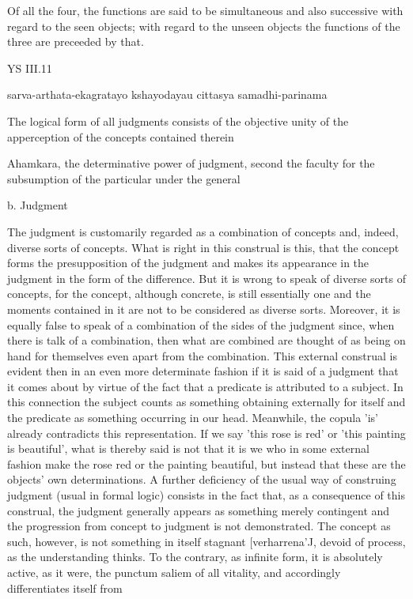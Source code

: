 Of all the four, the functions are said to be simultaneous and also successive
with regard to the seen objects;
with regard to the unseen objects
the functions of the three are preceeded by that.

YS III.11

sarva-arthata-ekagratayo kshayodayau cittasya samadhi-parinama

The logical form of all judgments consists of the objective unity of the
apperception of the concepts contained therein

Ahamkara, the determinative power of judgment,
second the faculty for the subsumption of the particular under the general

b. Judgment

The judgment is customarily regarded as
a combination of concepts and, indeed, diverse sorts of concepts.
What is right in this construal is this,
that the concept forms the presupposition of the judgment and
makes its appearance in the judgment in the form of the difference.
But it is wrong to speak of diverse sorts of concepts,
for the concept, although concrete, is still essentially one and
the moments contained in it are not to be considered as diverse sorts.
Moreover, it is equally false to speak of a combination of
the sides of the judgment since, when there is talk of a combination,
then what are combined are thought of as being on hand for themselves
even apart from the combination.
This external construal is evident then in an even more determinate fashion if it is said of a
judgment that it comes about by virtue of the fact that a predicate is attributed to
a subject.
In this connection the subject counts as something obtaining externally
for itself and the predicate as something occurring in our head.
Meanwhile, the copula 'is' already contradicts this representation.
If we say 'this rose is red' or 'this painting is beautiful',
what is thereby said is not that it is we who in some external
fashion make the rose red or the painting beautiful,
but instead that these are the objects' own determinations.
A further deficiency of the usual way of construing
judgment (usual in formal logic) consists in the fact that, as a consequence of this
construal, the judgment generally appears as something merely contingent and the
progression from concept to judgment is not demonstrated. The concept as such,
however, is not something in itself stagnant [verharrena'J, devoid of process, as the
understanding thinks. To the contrary, as infinite form, it is absolutely active, as
it were, the punctum saliem of all vitality, and accordingly differentiates itself from
